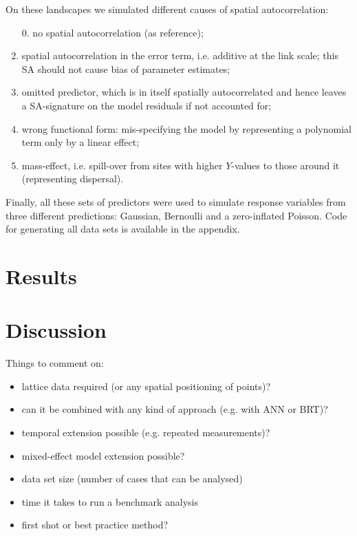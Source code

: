 \documentclass[11pt]{article}
\begin{document}
On these landscapes we simulated different causes of spatial autocorrelation:
\begin{enumerate}
\item[0.] no spatial autocorrelation (as reference);
\item spatial autocorrelation in the error term, i.e. additive at the link scale; this SA should not cause bias of parameter estimates;
\item omitted predictor, which is in itself spatially autocorrelated and hence leaves a SA-signature on the model residuals if not accounted for;
\item wrong functional form: mis-specifying the model by representing a polynomial term only by a linear effect;
\item mass-effect, i.e. spill-over from sites with higher $Y$-values to those around it (representing dispersal).
\end{enumerate}

Finally, all these sets of predictors were used to simulate response variables from three different predictions: Gaussian, Bernoulli and a zero-inflated Poisson. Code for generating all data sets is available in the appendix.

\section{Results}

\section{Discussion}

\noindent Things to comment on:
\begin{itemize}
\item lattice data required (or any spatial positioning of points)?
\item can it be combined with any kind of approach (e.g. with ANN or BRT)?
\item temporal extension possible (e.g. repeated measurements)?
\item mixed-effect model extension possible?
\item data set size (number of cases that can be analysed)
\item time it takes to run a benchmark analysis
\item first shot or best practice method?
\end{itemize}
\end{document}
